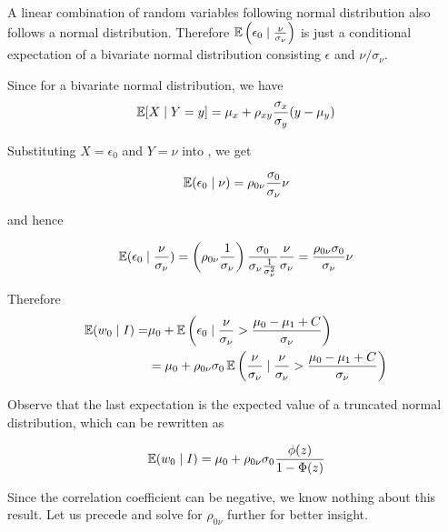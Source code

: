 A linear combination of random variables following normal distribution
also follows a normal distribution. Therefore $\operatorname{\mathbb{E}}\left(\epsilon_0 \mid \frac{\nu}{\sigma_\nu}\right)$
is just a conditional expectation of a bivariate normal distribution
consisting $\epsilon$ and $\nu/\sigma_\nu$.

Since for a bivariate normal distribution, we have 
\begin{equation}
    \label{eq:biv-exp}
    \operatorname{\mathbb{E}}[X \mid Y=y] = \mu_x + \rho_{xy}\frac{\sigma_x}{\sigma_y}(y - \mu_y) 
\end{equation}

Substituting $X=\epsilon_0$ and $Y=\nu$ into , we get

\begin{equation}
    \label{eq:biv_normal_exp_0}
    \operatorname{\mathbb{E}}(\epsilon_0 \mid \nu)=\rho_{0\nu}\frac{\sigma_0}{\sigma_\nu}\nu
\end{equation}

and hence

\begin{equation*}
    \operatorname{\mathbb{E}}(\epsilon_0 \mid \frac{\nu}{\sigma_\nu})=
    \left(\rho_{0\nu} \frac{1}{\sigma_\nu}\right)
    \frac{\sigma_0}{\sigma_\nu \frac{1}{\sigma_\nu^2}}
    \frac{\nu}{\sigma_\nu}=\frac{\rho_{0\nu}\sigma_0 }{\sigma_\nu}\nu
\end{equation*}

Therefore
\begin{align}
    \operatorname{\mathbb{E}}(w_{0} \mid I) =& 
     \mu_0 + \operatorname{\mathbb{E}} \left(
            \epsilon_0 \mid \frac{\nu}{\sigma_\nu} > \frac{\mu_0 - \mu_1 + C}{\sigma_\nu}
            \right) \nonumber \\
    &= \mu_0 + \rho_{0\nu}\sigma_0 \operatorname{\mathbb{E}} \left(
        \frac{\nu}{\sigma_\nu} 
        \mid
        \frac{\nu}{\sigma_\nu} > \frac{\mu_0 - \mu_1 + C}{\sigma_\nu}
    \right) \label{eq:before_trunc}
\end{align}

Observe that the last expectation 
is the expected value of a truncated normal distribution, 
which can be rewritten as 

\begin{equation}
    \label{eq:exp_wo_1}
    \operatorname{\mathbb{E}}(w_{0} \mid I) = 
    \mu_0 + \rho_{0\nu}\sigma_0 \frac{\phi(z)}{1-\Phi(z)}
\end{equation}

Since the correlation coefficient can be negative,
we know nothing about this result. 
Let us precede and solve for $\rho_{0\nu}$ 
further for better insight. 


